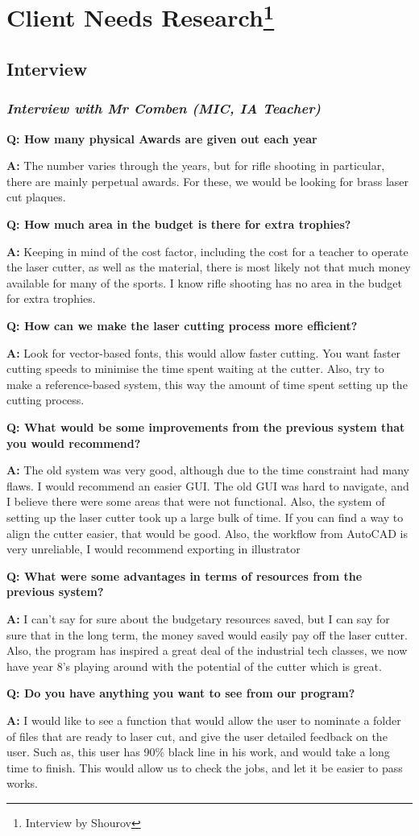 \documentclass[oneside,openany,11pt,a4paper]{report}
\newenvironment{qanda}{\setlength{\parindent}{0pt}}{\bigskip}
\newcommand{\Q}{\bigskip\bfseries Q: }
\newcommand{\A}{\par\textbf{A:} \normalfont}
\begin{document}
\section[Client Needs Research]{Client Needs Research\protect\footnote{Interview by Shourov}}
\subsection{Interview}
\subsubsection{\textit{Interview with Mr Comben (MIC, IA Teacher)}}
\begin{qanda}
\Q How many physical Awards are given out each year
\A The number varies through the years, but for rifle shooting in particular, there are mainly perpetual awards. For these, we would be looking for brass laser cut plaques.

\Q How much area in the budget is there for extra trophies?
\A Keeping in mind of the cost factor, including the cost for a teacher to operate the laser cutter, as well as the material, there is most likely not that much money available for many of the sports. I know rifle shooting has no area in the budget for extra trophies.

\Q How can we make the laser cutting process more efficient?
\A Look for vector-based fonts, this would allow faster cutting. You want faster cutting speeds to minimise the time spent waiting at the cutter. Also, try to make a reference-based system, this way the amount of time spent setting up the cutting process.

\Q What would be some improvements from the previous system that you would recommend?
\A The old system was very good, although due to the time constraint had many flaws. I would recommend an easier GUI. The old GUI was hard to navigate, and I believe there were some areas that were not functional. Also, the system of setting up the laser cutter took up a large bulk of time. If you can find a way to align the cutter easier, that would be good. Also, the workflow from AutoCAD is very unreliable, I would recommend exporting in illustrator

\Q What were some advantages in terms of resources from the previous system?
\A I can’t say for sure about the budgetary resources saved, but I can say for sure that in the long term, the money saved would easily pay off the laser cutter. Also, the program has inspired a great deal of the industrial tech classes, we now have year 8’s playing around with the potential of the cutter which is great.

\Q Do you have anything you want to see from our program?
\A I would like to see a function that would allow the user to nominate a folder of files that are ready to laser cut, and give the user detailed feedback on the user. Such as, this user has 90\% black line in his work, and would take a long time to finish. This would allow us to check the jobs, and let it be easier to pass works.
\end{qanda}
\end{document}
